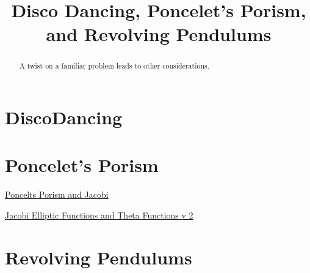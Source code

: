 \documentclass{ximera}
\title{Disco Dancing, Poncelet's Porism, and Revolving Pendulums}
\begin{document}
\begin{abstract}
A twist on a familiar problem leads to other considerations.
\end{abstract}
\maketitle

\section*{DiscoDancing}

\section*{Poncelet's Porism}



\begin{onlineOnly}
    \begin{center}
\end{center}
\end{onlineOnly}

\href{https://www.desmos.com/calculator/lwbypn9rje}{Poncelts Porism and Jacobi}


\begin{onlineOnly}
    \begin{center}
\end{center}
\end{onlineOnly}

\href{https://www.desmos.com/calculator/rxknxafhly}{Jacobi Elliptic Functions and Theta Functions v 2}




\section*{Revolving Pendulums}
\end{document}
